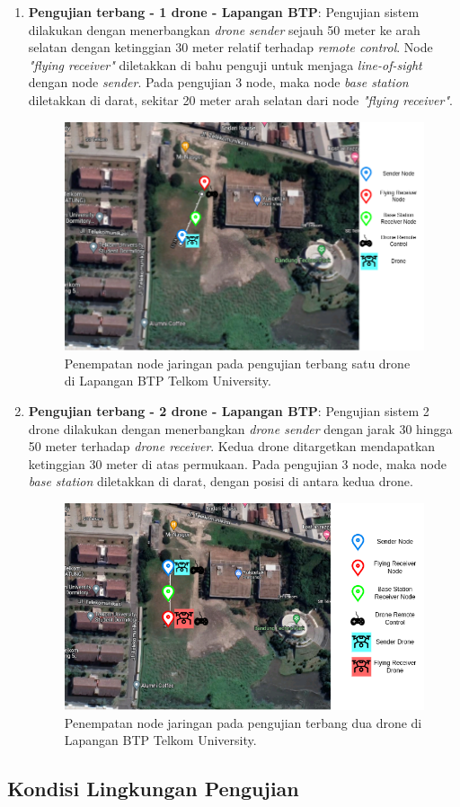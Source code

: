 \begin{enumerate}
	\item \textbf{Pengujian terbang - 1 drone - Lapangan BTP}: Pengujian sistem dilakukan dengan menerbangkan \textit{drone} \textit{sender} sejauh 50 meter ke arah selatan dengan ketinggian 30 meter relatif terhadap \textit{remote control}. Node \textit{"flying receiver"} diletakkan di bahu penguji untuk menjaga \textit{line-of-sight} dengan node \textit{sender}. Pada pengujian 3 node, maka node \textit{base station} diletakkan di darat, sekitar 20 meter arah selatan dari node \textit{"flying receiver"}.
	\begin{figure}[H]
		\centering
		\includegraphics[scale=0.5]{./assets/PetaTerbangSatuBTP}
		\caption{Penempatan node jaringan pada pengujian terbang satu drone di Lapangan BTP Telkom University.}
	\end{figure}

	\item \textbf{Pengujian terbang - 2 drone - Lapangan BTP}: Pengujian sistem 2 drone dilakukan dengan menerbangkan \textit{drone sender} dengan jarak 30 hingga 50 meter terhadap \textit{drone receiver}. Kedua drone ditargetkan mendapatkan ketinggian 30 meter di atas permukaan. Pada pengujian 3 node, maka node \textit{base station} diletakkan di darat, dengan posisi di antara kedua drone.
	\begin{figure}[H]
		\centering
		\includegraphics[scale=0.5]{./assets/PetaTerbangDuaBTP}
		\caption{Penempatan node jaringan pada pengujian terbang dua drone di Lapangan BTP Telkom University.}
	\end{figure}

\end{enumerate}

\subsection{Kondisi Lingkungan Pengujian}
